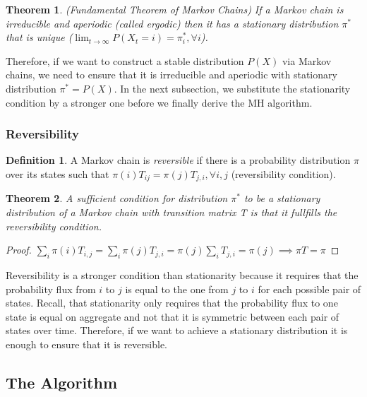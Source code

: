 \documentclass[12pt,english,a4paper,oneside]{article}
\newtheorem{theorem}{Theorem}[section]
\theoremstyle{definition}
\newtheorem{definition}{Definition}[section]
\theoremstyle{definition}
\theoremstyle{definition}
\theoremstyle{definition}
\theoremstyle{remark}
\begin{document}
\begin{theorem} (Fundamental Theorem of Markov Chains)
If a Markov chain is irreducible and aperiodic (called ergodic) then it has a stationary distribution $\pi^*$ that is unique ($\lim_{t \rightarrow \infty} P(X_t = i) = \pi_i^*, \forall i$).
\end{theorem}

\noindent
Therefore, if we want to construct a stable distribution \(P(X)\) via Markov chains, we need to ensure that it is irreducible and aperiodic with stationary distribution \(\pi^*=P(X)\). In the next subsection, we substitute the stationarity condition by a stronger one before we finally derive the MH algorithm.

\hypertarget{reversibility}{%
\subsubsection{Reversibility}\label{reversibility}}

\begin{definition}
A Markov chain is \textit{reversible} if there is a probability distribution $\pi$ over its states such that $\pi(i) T_{ij} = \pi(j)T_{j,i}, \forall i,j$ (reversibility condition).
\end{definition}

\begin{theorem}
A sufficient condition for distribution $\pi^*$ to be a stationary distribution of a Markov chain with transition matrix T is that it fullfills the reversibility condition.
\end{theorem}

\begin{proof}
$\sum_i \pi(i) T_{i,j} = \sum_i \pi(j) T_{j,i} = \pi(j) \sum_i  T_{j,i} = \pi(j) \implies \pi T = \pi$
\end{proof}

\noindent
Reversibility is a stronger condition than stationarity because it requires that the probability flux from \(i\) to \(j\) is equal to the one from \(j\) to \(i\) for each possible pair of states. Recall, that stationarity only requires that the probability flux to one state is equal on aggregate and not that it is symmetric between each pair of states over time. Therefore, if we want to achieve a stationary distribution it is enough to ensure that it is reversible.

\hypertarget{the-algorithm}{%
\subsection{The Algorithm}\label{the-algorithm}}
\end{document}
